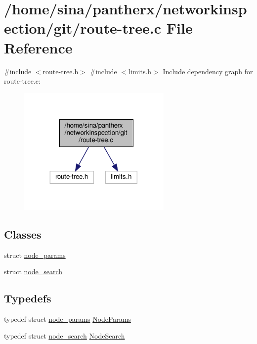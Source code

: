 \hypertarget{route-tree_8c}{}\section{/home/sina/pantherx/networkinspection/git/route-\/tree.c File Reference}
\label{route-tree_8c}
{\ttfamily \#include $<$route-\/tree.\+h$>$}\newline
{\ttfamily \#include $<$limits.\+h$>$}\newline
Include dependency graph for route-\/tree.c\+:\nopagebreak
\begin{figure}[H]
\begin{center}
\leavevmode
\includegraphics[width=212pt]{route-tree_8c__incl}
\end{center}
\end{figure}
\subsection*{Classes}
\begin{DoxyCompactItemize}
\item 
struct \hyperlink{structnode__params}{node\+\_\+params}
\item 
struct \hyperlink{structnode__search}{node\+\_\+search}
\end{DoxyCompactItemize}
\subsection*{Typedefs}
\begin{DoxyCompactItemize}
\item 
typedef struct \hyperlink{structnode__params}{node\+\_\+params} \hyperlink{route-tree_8c_a3aa763b62cd1d285ed35bb7f0fe4d149}{Node\+Params}
\item 
typedef struct \hyperlink{structnode__search}{node\+\_\+search} \hyperlink{route-tree_8c_a26d9b840f9226a0ce349b00950ea0bdc}{Node\+Search}
\end{DoxyCompactItemize}

